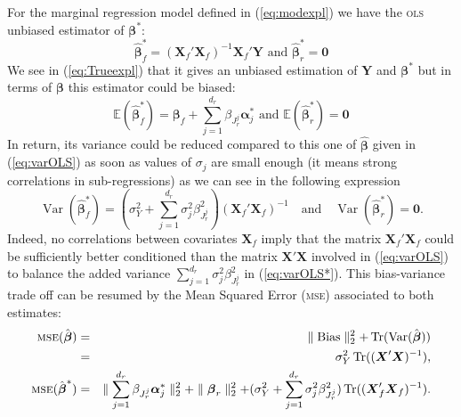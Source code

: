 \documentclass[12pt,a4paper]{report}
\begin{document}
For the marginal regression model defined in (\ref{eq:modexpl})
we have the \textsc{ols} unbiased estimator of $\boldsymbol{\beta}^*$: 
		\begin{equation}
			\hat{\boldsymbol{\beta}}_{f}^* = (\boldsymbol{X}_{f}'\boldsymbol{X}_{f})^{-1}\boldsymbol{X}_{f}'\boldsymbol{Y}  \textrm{ and }\boldsymbol{\hat\beta}_{r}^* = \boldsymbol{0} \nonumber 
		\end{equation}
		We see in (\ref{eq:Trueexpl}) that it gives an unbiased estimation of $\boldsymbol{Y}$ and $\boldsymbol{\beta^*}$
		but in terms of $\boldsymbol{\beta}$ this estimator could be biased:
		\begin{equation}
			\mathbb{E}(\hat{\boldsymbol{\beta}}_{f}^*)=\boldsymbol{\beta}_{f}+\sum_{j =1}^{d_r}\beta_{J_r^j}\boldsymbol{\alpha}_j^* \textrm{ and }\mathbb{E}(\hat{\boldsymbol{\beta}}_{r}^*)=\boldsymbol{0}  \nonumber 
		\end{equation}
		In return, its variance could be reduced compared to this one of $\hat{\boldsymbol{\beta}}$ given in (\ref{eq:varOLS}) as soon as values of $\sigma_j$ are small enough (it means strong correlations in sub-regressions) as we can see in the following expression
		\begin{equation}
			\operatorname{Var}(\hat{\boldsymbol{\beta}}_f^*)= (\sigma^2_Y+\sum_{j =1}^{d_r}\sigma^2_{j}\beta_{J_r^j}^2)(\boldsymbol{X}_f' \boldsymbol{X}_f)^{-1} \quad \textrm{and} \quad\operatorname{Var}(\hat{\boldsymbol{\beta}}_r^*)= \boldsymbol{0}. \label{eq:varOLS*}
		\end{equation}
Indeed, no correlations between covariates $\boldsymbol{X}_f$ imply that the matrix $\boldsymbol{X}_f' \boldsymbol{X}_f$ could be sufficiently better conditioned than the matrix $\boldsymbol{X}' \boldsymbol{X}$ involved in (\ref{eq:varOLS}) to balance the added variance $\sum_{j =1}^{d_r}\sigma^2_{j}\beta_{J_r^j}^2$ in (\ref{eq:varOLS*}). This bias-variance trade off can be resumed by the Mean Squared Error (\textsc{mse}) associated to both estimates:
	\begin{eqnarray}
	\textsc{mse}(\hat{\boldsymbol{\beta}})&=&\parallel \operatorname{Bias}\parallel_2^2+\operatorname{Tr}(\operatorname{Var}(\hat{\boldsymbol{\beta}}))  \nonumber \\
			&=& \sigma_Y^2 \operatorname{Tr}((\boldsymbol{X}'\boldsymbol{X})^{-1}),
			 \nonumber  \\
			\textsc{mse}(\hat{\boldsymbol{\beta}}^*)&=& \parallel\sum_{j =1}^{d_r}\beta_{J_r^j}\boldsymbol{\alpha}_j^* \parallel_2^2 +\parallel \boldsymbol{\beta}_r\parallel^2_2 + (\sigma^2_Y+\sum_{j =1}^{d_r}\sigma^2_{j}\beta_{J_r^j}^2 ) \operatorname{Tr}((\boldsymbol{X}_f' \boldsymbol{X}_f)^{-1}). \nonumber 
	\end{eqnarray}	 	
\end{document}
